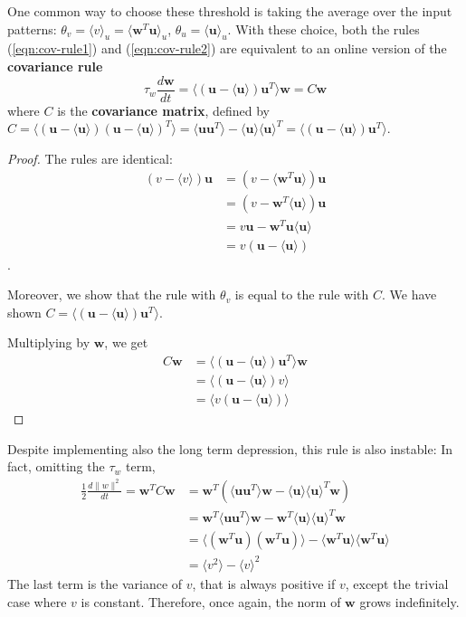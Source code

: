 \documentclass[oneside]{book}
\renewcommand{\u}{\mathbf{u}}
\newcommand{\w}{\mathbf{w}}
\newcommand{\avg}[1]{\langle #1 \rangle}
\theoremstyle{definition}
\theoremstyle{plain}
\begin{document}
One common way to choose these threshold is taking the average over the input patterns: $\theta_v =\langle v\rangle_u = \langle \w^T\u\rangle_u$, $\theta_u =\langle \u \rangle_u$.
With these choice, both the rules (\ref{eqn:cov-rule1}) and (\ref{eqn:cov-rule2}) are equivalent to an online version of the \textbf{covariance rule}
\begin{equation}
    \label{eqn:covariance-rule}
    \tau_w \frac{d\w}{dt} = \avg{(\u- \avg{\u})\u^T}\w =C\w
\end{equation}
where $C$ is the \textbf{covariance matrix}, defined by
$C= \avg{(\u-\avg{\u})(\u-\avg{\u})^T} = \avg{\u\u^T} - \avg{\u} \avg{\u}^T =\avg{(\u-\avg \u ) \u^T}$.
\begin{proof}
    The rules are identical:
    \begin{align*}
    (v-\avg{v})\u &= (v- \avg{\w^T\u})\u \\
    &= (v- \w^T\avg{\u})\u \\
    &= v\u - \w^T\u\avg{\u} \\
    &= v(\u-\avg{\u})
\end{align*}.
    
    Moreover, we show that the rule with $\theta_v$ is equal to the rule with $C$. We have shown $C=\avg{(\u-\avg \u )\u^T}$.
    
Multiplying by $\w$, we get 
\begin{align*}
C\w &= \avg{(\u-\avg{\u})\u^T}\w\\
&=\avg{( \u-\avg{\u})v} \\
&=\avg{v(\u-\avg{\u})}
\end{align*}


    
\end{proof}
Despite implementing also the long term depression, this rule is also instable: In fact, omitting the $\tau_w$ term,
\begin{align*}
    \frac{1}{2}\frac{d\|w\|^2}{dt} = \w^TC\w  &= \w^T (\avg{\u\u^T}\w - \avg{\u} \avg{\u}^T\w)\\
    &= \w^T\avg{\u\u^T}\w - \w^T\avg{\u}\avg{\u}^T \w \\
    &= \avg{(\w^T\u)(\w^T\u)} - \avg{\w^T\u}\avg{\w^T\u} \\
    &= \avg{v^2}- \avg v ^2 
\end{align*}
The last term is the variance of $v$, that is always positive if $v$, except the trivial case where $v$ is constant.
Therefore, once again, the norm of $\w$ grows indefinitely.
\end{document}
